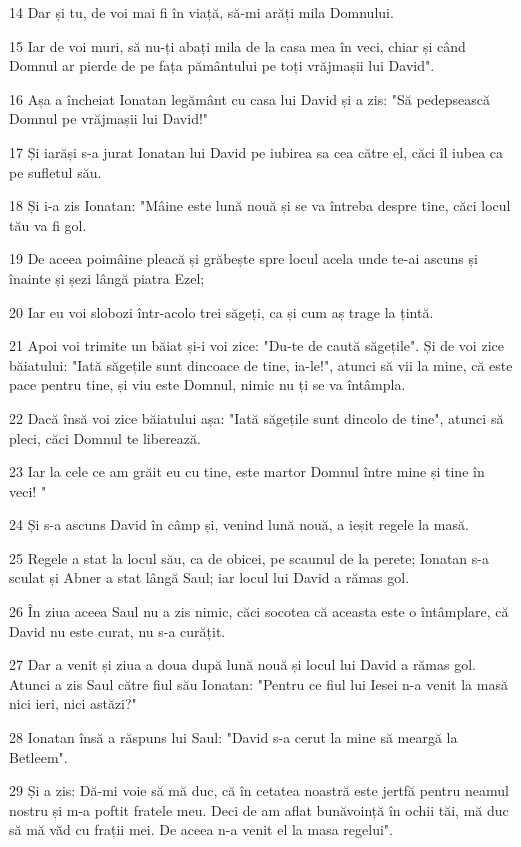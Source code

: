 \par 14 Dar și tu, de voi mai fi în viață, să-mi arăți mila Domnului.
\par 15 Iar de voi muri, să nu-ți abați mila de la casa mea în veci, chiar și când Domnul ar pierde de pe fața pământului pe toți vrăjmașii lui David".
\par 16 Așa a încheiat Ionatan legământ cu casa lui David și a zis: "Să pedepsească Domnul pe vrăjmașii lui David!"
\par 17 Și iarăși s-a jurat Ionatan lui David pe iubirea sa cea către el, căci îl iubea ca pe sufletul său.
\par 18 Și i-a zis Ionatan: "Mâine este lună nouă și se va întreba despre tine, căci locul tău va fi gol.
\par 19 De aceea poimâine pleacă și grăbește spre locul acela unde te-ai ascuns și înainte și șezi lângă piatra Ezel;
\par 20 Iar eu voi slobozi într-acolo trei săgeți, ca și cum aș trage la țintă.
\par 21 Apoi voi trimite un băiat și-i voi zice: "Du-te de caută săgețile". Și de voi zice băiatului: "Iată săgețile sunt dincoace de tine, ia-le!", atunci să vii la mine, că este pace pentru tine, și viu este Domnul, nimic nu ți se va întâmpla.
\par 22 Dacă însă voi zice băiatului așa: "Iată săgețile sunt dincolo de tine", atunci să pleci, căci Domnul te liberează.
\par 23 Iar la cele ce am grăit eu cu tine, este martor Domnul între mine și tine în veci! "
\par 24 Și s-a ascuns David în câmp și, venind lună nouă, a ieșit regele la masă.
\par 25 Regele a stat la locul său, ca de obicei, pe scaunul de la perete; Ionatan s-a sculat și Abner a stat lângă Saul; iar locul lui David a rămas gol.
\par 26 În ziua aceea Saul nu a zis nimic, căci socotea că aceasta este o întâmplare, că David nu este curat, nu s-a curățit.
\par 27 Dar a venit și ziua a doua după lună nouă și locul lui David a rămas gol. Atunci a zis Saul către fiul său Ionatan: "Pentru ce fiul lui Iesei n-a venit la masă nici ieri, nici astăzi?"
\par 28 Ionatan însă a răspuns lui Saul: "David s-a cerut la mine să meargă la Betleem".
\par 29 Și a zis: Dă-mi voie să mă duc, că în cetatea noastră este jertfă pentru neamul nostru și m-a poftit fratele meu. Deci de am aflat bunăvoință în ochii tăi, mă duc să mă văd cu frații mei. De aceea n-a venit el la masa regelui".
